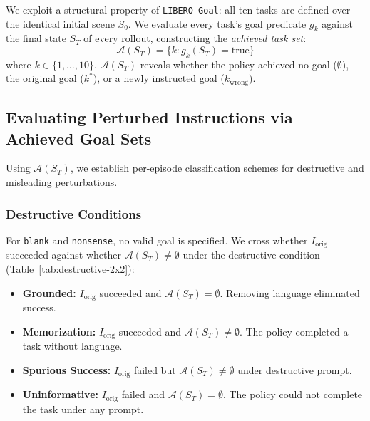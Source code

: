\documentclass[11pt]{article}
\begin{document}
We exploit a structural property of \texttt{LIBERO-Goal}: all ten tasks are defined over the identical initial scene $S_0$. We evaluate every task's goal predicate $g_k$ against the final state $S_T$ of every rollout, constructing the \emph{achieved task set}:
\begin{equation}
\mathcal{A}(S_T) = \{k : g_k(S_T) = \text{true}\}
\end{equation}
where $k \in \{1, \dots, 10\}$. $\mathcal{A}(S_T)$ reveals whether the policy achieved no goal ($\emptyset$), the original goal ($k^*$), or a newly instructed goal ($k_{\text{wrong}}$).

\subsection{Evaluating Perturbed Instructions via Achieved Goal Sets}
\label{subsec:evaluating-perturbations}

Using $\mathcal{A}(S_T)$, we establish per-episode classification schemes for destructive and misleading perturbations.

\subsubsection{Destructive Conditions}
For \texttt{blank} and \texttt{nonsense}, no valid goal is specified. We cross whether $I_{\text{orig}}$ succeeded against whether $\mathcal{A}(S_T) \neq \emptyset$ under the destructive condition (Table~\ref{tab:destructive-2x2}):
\begin{itemize}
    \item \textbf{Grounded:} $I_{\text{orig}}$ succeeded and $\mathcal{A}(S_T) = \emptyset$. Removing language eliminated success.
    \item \textbf{Memorization:} $I_{\text{orig}}$ succeeded and $\mathcal{A}(S_T) \neq \emptyset$. The policy completed a task without language.
    \item \textbf{Spurious Success:} $I_{\text{orig}}$ failed but $\mathcal{A}(S_T) \neq \emptyset$ under destructive prompt.
    \item \textbf{Uninformative:} $I_{\text{orig}}$ failed and $\mathcal{A}(S_T) = \emptyset$. The policy could not complete the task under any prompt.
\end{itemize}
\end{document}
